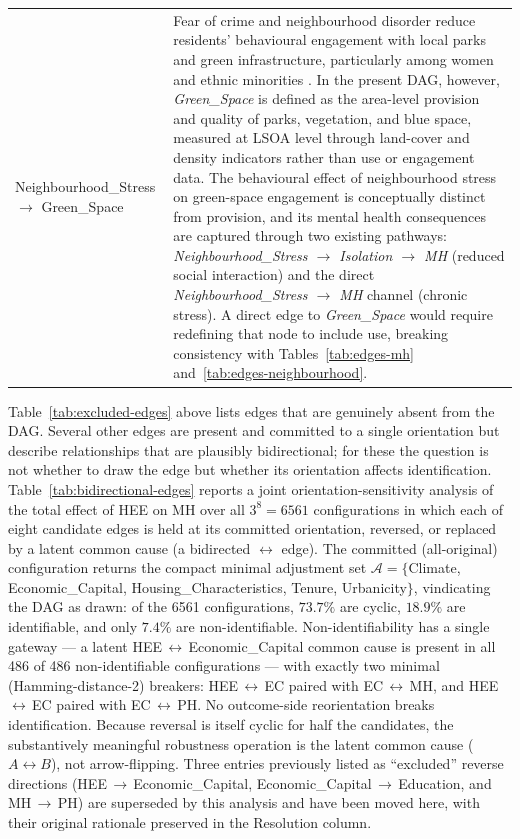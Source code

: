 \begin{longtable}{@{}p{3.8cm}p{11.2cm}@{}}
\addlinespace
Neighbourhood\_Stress $\to$ Green\_Space & Fear of crime and neighbourhood disorder reduce residents' behavioural engagement with local parks and green infrastructure, particularly among women and ethnic minorities \citep{sreetheran_socio-ecological_2014, branas_citywide_2018}. In the present DAG, however, \textit{Green\_Space} is defined as the area-level provision and quality of parks, vegetation, and blue space, measured at LSOA level through land-cover and density indicators rather than use or engagement data. The behavioural effect of neighbourhood stress on green-space engagement is conceptually distinct from provision, and its mental health consequences are captured through two existing pathways: \textit{Neighbourhood\_Stress $\to$ Isolation $\to$ MH} (reduced social interaction) and the direct \textit{Neighbourhood\_Stress $\to$ MH} channel (chronic stress). A direct edge to \textit{Green\_Space} would require redefining that node to include use, breaking consistency with Tables~\ref{tab:edges-mh} and~\ref{tab:edges-neighbourhood}. \\
\end{longtable}


Table~\ref{tab:excluded-edges} above lists edges that are genuinely absent from the
DAG. Several other edges are present and committed to a single orientation but
describe relationships that are plausibly bidirectional; for these the question is not
whether to draw the edge but whether its orientation affects identification.
Table~\ref{tab:bidirectional-edges} reports a joint orientation-sensitivity analysis of
the total effect of HEE on MH over all $3^{8}=6561$ configurations in which each of
eight candidate edges is held at its committed orientation, reversed, or replaced by a
latent common cause (a bidirected $\leftrightarrow$ edge). The committed (all-original)
configuration returns the compact minimal adjustment set $\mathcal{A}=\{$Climate,
Economic\_Capital, Housing\_Characteristics, Tenure, Urbanicity$\}$, vindicating the
DAG as drawn: of the 6561 configurations, $73.7\%$ are cyclic, $18.9\%$ are
identifiable, and only $7.4\%$ are non-identifiable. Non-identifiability has a single
gateway --- a latent HEE\,$\leftrightarrow$\,Economic\_Capital common cause is present
in all 486 of 486 non-identifiable configurations --- with exactly two minimal
(Hamming-distance-2) breakers: HEE\,$\leftrightarrow$\,EC paired with
EC\,$\leftrightarrow$\,MH, and HEE\,$\leftrightarrow$\,EC paired with
EC\,$\leftrightarrow$\,PH. No outcome-side reorientation breaks identification. Because
reversal is itself cyclic for half the candidates, the substantively meaningful
robustness operation is the latent common cause ($A\leftrightarrow B$), not
arrow-flipping. Three entries previously listed as ``excluded'' reverse directions
(HEE\,$\to$\,Economic\_Capital, Economic\_Capital\,$\to$\,Education, and MH\,$\to$\,PH)
are superseded by this analysis and have been moved here, with their original rationale
preserved in the Resolution column.

